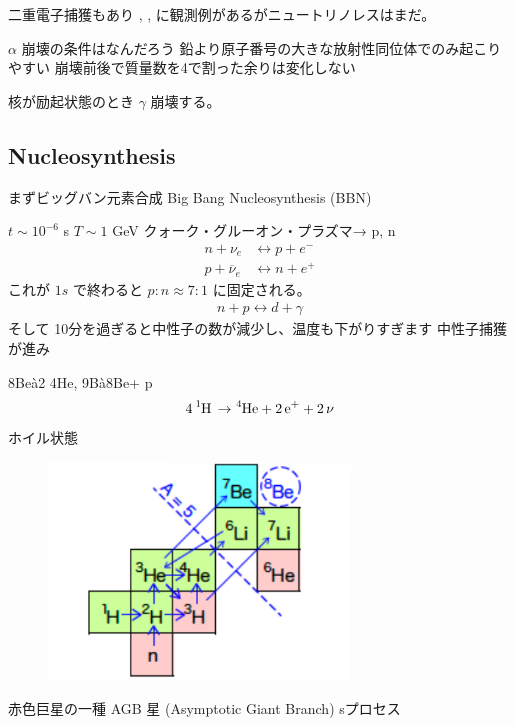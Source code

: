 \documentclass[uplatex,dvipdfmx,a4paper,11pt]{jlreq}
\numberwithin{equation}{section}
\theoremstyle{definition}
\begin{document}
二重電子捕獲もあり , ,  に観測例があるがニュートリノレスはまだ。

$\alpha$ 崩壊の条件はなんだろう
鉛より原子番号の大きな放射性同位体でのみ起こりやすい
崩壊前後で質量数を4で割った余りは変化しない

核が励起状態のとき $\gamma$ 崩壊する。



\subsection{Nucleosynthesis}
まずビッグバン元素合成 Big Bang Nucleosynthesis (BBN)

$t\sim 10^{-6}$ \si{s}
$T\sim 1$ \si{GeV} クォーク・グルーオン・プラズマ→ p, n
\begin{align}
  n + \nu_e            & \leftrightarrow p + e^- \\
  p + \overline{\nu}_e & \leftrightarrow n + e^+
\end{align}
これが $1s$ で終わると $p:n \approx 7:1$ に固定される。
\begin{align}
  n + p \leftrightarrow d + \gamma
\end{align}
そして
10分を過ぎると中性⼦の数が減少し、温度も下がりすぎます
中性⼦捕獲が進み

8Beà2 4He, 9Bà8Be+ p
\begin{align}
  \ce{4^1H \to ^4He + 2e^+ + 2\nu}
\end{align}
ホイル状態
\begin{figure}[htbp]
  \begin{center}
    \includegraphics[width=8cm]{./assets/nuclear.png}
    \caption{}
    \label{fig:2level}
  \end{center}
\end{figure}

赤色巨星の一種 AGB 星 (Asymptotic Giant Branch)  sプロセス
\end{document}

